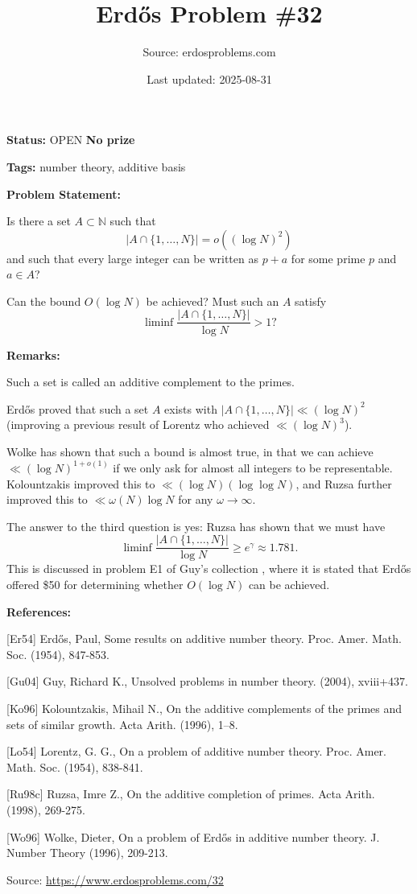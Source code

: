 \documentclass{article}
\title{Erd\H{o}s Problem \#32}
\date{Last updated: 2025-08-31}
\author{Source: erdosproblems.com}
\begin{document}
\maketitle

\noindent\textbf{Status:} OPEN \quad \textbf{No prize}

\noindent\textbf{Tags:} number theory, additive basis

\medskip
\noindent\textbf{Problem Statement:}

Is there a set $A\subset\mathbb{N}$ such that\[\lvert A\cap\{1,\ldots,N\}\rvert = o((\log N)^2)\]and such that every large integer can be written as $p+a$ for some prime $p$ and $a\in A$? 

Can the bound $O(\log N)$ be achieved? Must such an $A$ satisfy\[\liminf \frac{\lvert A\cap\{1,\ldots,N\}\rvert}{\log N}> 1?\]

\bigskip
\noindent\textbf{Remarks:}

Such a set is called an additive complement to the primes.

Erd\H{o}s \cite{Er54} proved that such a set $A$ exists with $\lvert A\cap\{1,\ldots,N\}\rvert\ll (\log N)^2$ (improving a previous result of Lorentz \cite{Lo54} who achieved $\ll (\log N)^3$). 

Wolke \cite{Wo96} has shown that such a bound is almost true, in that we can achieve $\ll (\log N)^{1+o(1)}$ if we only ask for almost all integers to be representable. Kolountzakis \cite{Ko96} improved this to $\ll (\log N)(\log\log N)$, and Ruzsa \cite{Ru98c} further improved this to $\ll \omega(N)\log N$ for any $\omega\to \infty$.

The answer to the third question is yes: Ruzsa \cite{Ru98c} has shown that we must have\[\liminf \frac{\lvert A\cap\{1,\ldots,N\}\rvert}{\log N}\geq e^\gamma\approx 1.781.\]This is discussed in problem E1 of Guy's collection \cite{Gu04}, where it is stated that Erd\H{o}s offered \$50 for determining whether $O(\log N)$ can be achieved.

\bigskip
\noindent\textbf{References:}

[Er54] Erd\H{o}s, Paul, Some results on additive number theory. Proc. Amer. Math. Soc. (1954), 847-853.
 
 [Gu04] Guy, Richard K., Unsolved problems in number theory. (2004), xviii+437.
 
 [Ko96] Kolountzakis, Mihail N., On the additive complements of the primes and sets of similar
growth. Acta Arith. (1996), 1--8.
 
 [Lo54] Lorentz, G. G., On a problem of additive number theory. Proc. Amer. Math. Soc. (1954), 838-841.
 
 [Ru98c] Ruzsa, Imre Z., On the additive completion of primes. Acta Arith. (1998), 269-275.
 
 [Wo96] Wolke, Dieter, On a problem of Erd\H{o}s in additive number theory. J. Number Theory (1996), 209-213.

\bigskip
\noindent\small{Source: \url{https://www.erdosproblems.com/32}}
\end{document}

